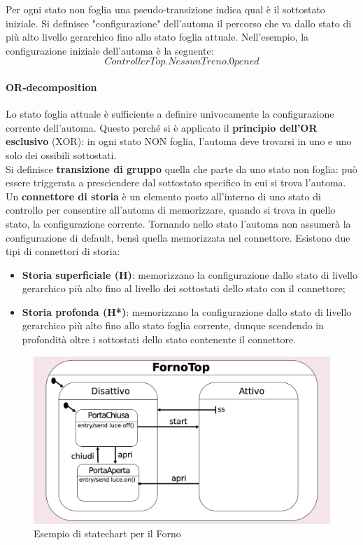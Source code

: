 Per ogni stato non foglia una pseudo-transizione indica qual è il sottostato iniziale. Si definisce "configurazione" dell'automa il percorso che va dallo stato di più alto livello gerarchico fino allo stato foglia attuale. Nell'esempio, la configurazione iniziale dell'automa è la seguente:\\

$$ControllerTop.NessunTreno.0pened$$

\paragraph{OR-decomposition} Lo stato foglia attuale è sufficiente a definire univocamente la configurazione corrente dell'automa. Questo perché si è applicato il \textbf{principio dell'OR esclusivo} (XOR): in ogni stato NON foglia, l'automa deve trovarsi in uno e uno solo dei ossibili sottostati.\\

Si definisce \textbf{transizione di gruppo} quella che parte da uno stato non foglia: può essere triggerata a presciendere dal sottostato specifico in cui si trova l'automa.\\ 

Un \textbf{connettore di storia} è un elemento posto all'interno di uno stato di controllo per consentire all'automa di memorizzare, quando si trova in quello stato, la configurazione corrente. Tornando nello stato l'automa non assumerà la configurazione di default, bensì quella memorizzata nel connettore. Esistono due tipi di connettori di storia:
\begin{itemize}
    \item \textbf{Storia superficiale (H)}: memorizzano la configurazione dallo stato di livello gerarchico più alto fino al livello dei sottostati dello stato con il connettore;
    \item \textbf{Storia profonda (H*)}: memorizzano la configurazione dallo stato di livello gerarchico più alto fino allo stato foglia corrente, dunque scendendo in profondità oltre i sottostati dello stato contenente il connettore.
\end{itemize}

\begin{figure}[h!]
    \centering
    \includegraphics[width=0.75\linewidth]{assets/UML/state/state5.png}
    \caption{Esempio di statechart per il Forno}
\end{figure}

